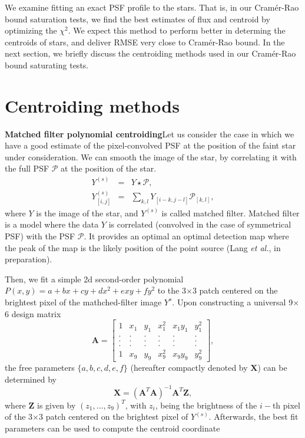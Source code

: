 \documentclass[12pt, preprint]{aastex}
\newcommand{\beq}{\begin{equation}}
\newcommand{\eeq}{\end{equation}}
\begin{document}
We examine fitting an exact
 PSF profile to the stars. That is, in our Cram\'{e}r-Rao bound saturation tests, we find the best
 estimates of flux and centroid by optimizing the $\chi^{2}$.
 We expect this method to perform better in determing the centroids
 of stars, and deliver RMSE very close to Cram\'{e}r-Rao bound. In the next section,
 we briefly discuss the centroiding methods used in our Cram\'{e}r-Rao bound saturating tests.
 
\section{Centroiding methods}\label{sec:method}

\item{\bf  Matched filter polynomial centroiding}\quad Let us consider the case 
in which we have a good estimate of the pixel-convolved PSF at
the position of the faint star under consideration. 
We can smooth the image of the star, by correlating it with the 
full PSF $\mathcal{P}$ at the position of the star.
\begin{eqnarray}
Y^{(s)} &=& Y \star \mathcal{P}, \\
Y^{(s)}_{[i,j]} &=& \sum_{k,l}Y_{[i-k,j-l]}\mathcal{P}_{[k,l]},
\end{eqnarray}
where $Y$ is the image of the star, and $Y^{(s)}$ is called matched filter. 
Matched filter is a model where the data $Y$ is correlated (convolved in the 
case of symmetrical PSF) with the PSF $\mathcal{P}$. It provides an optimal an 
optimal detection map where the peak of the map is the likely position of the 
point source (Lang \emph{et al.}, in preparation).

Then, we fit a simple 2d second-order polynomial 
$P(x,y)=a+bx+cy+dx^2+exy+fy^2$ 
to the 3$\times$3 patch centered on the brightest pixel of the
mathched-filter image $Y^{s}$.
Upon constructing a universal 9$\times$6 design matrix
\begin{equation}
    \mathbf{A} = 
    \begin{bmatrix}
        1 & x_{1} & y_{1} & x_{1}^{2} & x_{1}y_{1} & y_{1}^{2} \\
        . & . & . & . & . & .  \\
        . & . & . & . & . & .  \\
        . & . & . & . & . & .  \\
        1 & x_{9} & y_{9} & x_{9}^{2} & x_{9}y_{9} & y_{9}^{2}
    \end{bmatrix},
\end{equation}
the free parameters $\{a,b,c,d,e,f\}$
(hereafter compactly denoted by $\mathbf{X}$) can be determined by 
\beq
\mathbf{X} = (\mathbf{A}^{T}\mathbf{A})^{-1}\mathbf{A}^{T}\mathbf{Z},
\label{linearfit}
\eeq
where $\mathbf{Z}$ is given by $(z_{1},...,z_{9})^{T}$,
with $z_{i}$, being the brightness of the $i-$th pixel of the 3$\times$3 patch centered on the brightest pixel of $Y^{(s)}$.
Afterwards, the best fit parameters can be used to compute the centroid coordinate
\end{document}
